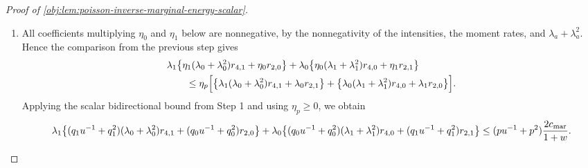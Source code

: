 \begin{proof}[Proof of \cref{obj:lem:poisson-inverse-marginal-energy-scalar}]
\begin{enumerate}
\item All coefficients multiplying \(\eta_0\) and \(\eta_1\) below are nonnegative, by the nonnegativity of the intensities, the moment rates, and \(\lambda_a+\lambda_a^2\).  Hence the comparison from the previous step gives
\[
\begin{aligned}
&\lambda_1\bigl\{\eta_1(\lambda_0+\lambda_0^2)r_{4,1}
 +\eta_0 r_{2,0}\bigr\}
+\lambda_0\bigl\{\eta_0(\lambda_1+\lambda_1^2)r_{4,0}
 +\eta_1 r_{2,1}\bigr\} \\
&\qquad\le
\eta_p\Bigl[
\bigl\{\lambda_1(\lambda_0+\lambda_0^2)r_{4,1}
 +\lambda_0 r_{2,1}\bigr\}
+
\bigl\{\lambda_0(\lambda_1+\lambda_1^2)r_{4,0}
 +\lambda_1 r_{2,0}\bigr\}
\Bigr].
\end{aligned}
\]
Applying the scalar bidirectional bound from Step 1 and using \(\eta_p\ge0\), we obtain
\[
\lambda_1\bigl\{(q_1u^{-1}+q_1^2)(\lambda_0+\lambda_0^2)r_{4,1}
 +(q_0u^{-1}+q_0^2)r_{2,0}\bigr\}
+\lambda_0\bigl\{(q_0u^{-1}+q_0^2)(\lambda_1+\lambda_1^2)r_{4,0}
 +(q_1u^{-1}+q_1^2)r_{2,1}\bigr\}
\le
(pu^{-1}+p^2){2c_{\mathrm{mar}}\over 1+w}.
\]
\end{enumerate}
\end{proof}
